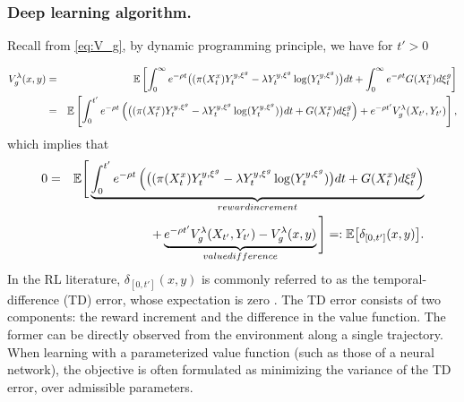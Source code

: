\documentclass[11pt]{amsart}
\theoremstyle{plain}
\def \dd{{\rm d}}
\numberwithin{equation}{section}
\begin{document}
\subsubsection{Deep learning algorithm.} Recall from \eqref{eq:V_g}, by dynamic programming principle, we have for $t'>0$
{\begin{eqnarray*} 
      V^{\lambda}_g (x,y) 
      &=&\mathbb{E} \left[ \int_0^{\infty}  e^{- \rho t} \big( ( \pi (X^x_{t} )Y_{t}^{y,\xi^g}-\lambda Y_{t}^{y,\xi^g} \log  (Y_{t}^{y,\xi^g} ) \big) \dd t 
+  \int_0^{\infty}  e^{- \rho t} G(X^x_t) \dd\xi_t^g \right]\\
&=&\mathbb{E} \left[ \int_0^{t'}  e^{- \rho t} \left(\big( ( \pi (X^x_{t} )Y_{t}^{y,\xi^g}-\lambda Y_{t}^{y,\xi^g} \log  (Y_{t}^{y,\xi^g} ) \big) \dd t 
+   G(X^x_t) \dd\xi_t^g\right) + e^{-\rho t'} V_g^\lambda(X_{t'},Y_{t'}) \right],
  \end{eqnarray*} 
  which implies that
  \begin{eqnarray*}
    0 &=&   \mathbb{E}\Bigg[\underbrace{ \int_0^{t'}  e^{- \rho t} \left(\big( ( \pi (X^x_{t} )Y_{t}^{y,\xi^g}-\lambda Y_{t}^{y,\xi^g} \log  (Y_{t}^{y,\xi^g} ) \big) \dd t 
+   G(X^x_t) \dd\xi_t^g\right)}_{\textrm{reward increment}} \\
&&\qquad \qquad + \underbrace{e^{-\rho t'} V^{\lambda}_g (X_{t'},Y_{t'})-V^{\lambda}_g (x,y)}_{\textrm{value difference}}\Bigg]=:\mathbb{E}\big[\delta_{[0,t']}(x,y)\big].
  \end{eqnarray*}
 In the RL literature, $\delta_{[0,t']}(x,y)$ is commonly referred to as the temporal-difference (TD) error, whose expectation is zero \cite{jia2022policy,sutton2008convergent,sutton2009fast}. The TD error consists of two components: the reward increment and the difference in the value function. The former can be directly observed from the environment along a single trajectory. When learning with a parameterized value function (such as those of a neural network), the objective is often formulated as minimizing the variance of the TD error, over admissible parameters.
 
}
\end{document}
